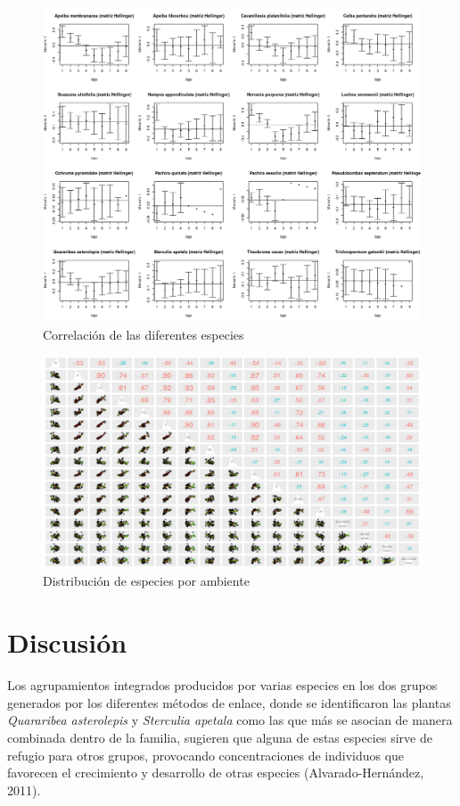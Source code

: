 \documentclass[11pt,]{article}
\begin{document}
\begin{figure}
\centering
\includegraphics{ecologia_espacial_files/figure-markdown_github/unnamed-chunk-10-1.png}
\caption{Correlación de las diferentes especies\label{diversidad}}
\end{figure}

\begin{figure}
\centering
\includegraphics{matriz_correlacion_suelo_abun_riq_spearman.png}
\caption{Distribución de especies por ambiente\label{ambiente}}
\end{figure}

\section{Discusión}\label{discusiuxf3n}

Los agrupamientos integrados producidos por varias especies en los dos
grupos generados por los diferentes métodos de enlace, donde se
identificaron las plantas \emph{Quararibea asterolepis} y
\emph{Sterculia apetala} como las que más se asocian de manera combinada
dentro de la familia, sugieren que alguna de estas especies sirve de
refugio para otros grupos, provocando concentraciones de individuos que
favorecen el crecimiento y desarrollo de otras especies
(Alvarado-Hernández, 2011).
\end{document}
